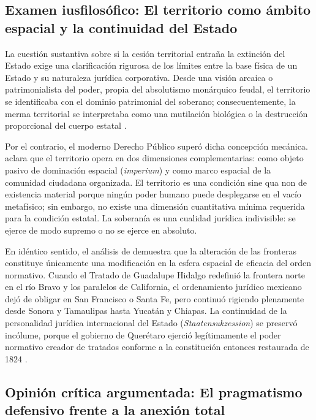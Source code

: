 \documentclass[12pt,spanish,letterpaper,oneside]{article}
\begin{document}
\subsection{Examen iusfilos\'ofico: El territorio como \'ambito espacial y la continuidad del Estado}

La cuesti\'on sustantiva sobre si la cesi\'on territorial entra\~na la extinci\'on del Estado exige una clarificaci\'on rigurosa de los l\'imites entre la base f\'isica de un Estado y su naturaleza jur\'idica corporativa. Desde una visi\'on arcaica o patrimonialista del poder, propia del absolutismo mon\'arquico feudal, el territorio se identificaba con el dominio patrimonial del soberano; consecuentemente, la merma territorial se interpretaba como una mutilaci\'on biol\'ogica o la destrucci\'on proporcional del cuerpo estatal \citep[pp.~115--122]{andrade2003}.

Por el contrario, el moderno Derecho P\'ublico super\'o dicha concepci\'on mec\'anica. \citet[pp.~398--406]{jellinek2018teoria} aclara que el territorio opera en dos dimensiones complementarias: como objeto pasivo de dominaci\'on espacial (\emph{imperium}) y como marco espacial de la comunidad ciudadana organizada. El territorio es una condici\'on sine qua non de existencia material porque ning\'un poder humano puede desplegarse en el vac\'io metaf\'isico; sin embargo, no existe una dimensi\'on cuantitativa m\'inima requerida para la condici\'on estatal. La soberan\'ia es una cualidad jur\'idica indivisible: se ejerce de modo supremo o no se ejerce en absoluto. 

En id\'entico sentido, el an\'alisis de \citet[pp.~213--220]{kelsen2020teoria} demuestra que la alteraci\'on de las fronteras constituye \'unicamente una modificaci\'on en la esfera espacial de eficacia del orden normativo. Cuando el Tratado de Guadalupe Hidalgo redefini\'o la frontera norte en el r\'io Bravo y los paralelos de California, el ordenamiento jur\'idico mexicano dej\'o de obligar en San Francisco o Santa Fe, pero continu\'o rigiendo plenamente desde Sonora y Tamaulipas hasta Yucat\'an y Chiapas. La continuidad de la personalidad jur\'idica internacional del Estado (\emph{Staatensukzession}) se preserv\'o inc\'olume, porque el gobierno de Quer\'etaro ejerci\'o leg\'itimamente el poder normativo creador de tratados conforme a la constituci\'on entonces restaurada de 1824 \citep[pp.~92--101]{tenaRamirez1999,verdross2012}.

\subsection{Opini\'on cr\'itica argumentada: El pragmatismo defensivo frente a la anexi\'on total}
\end{document}
